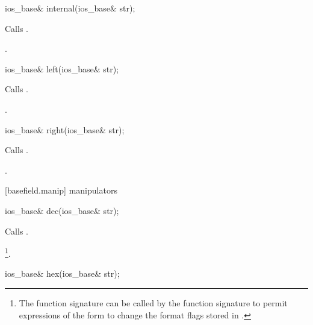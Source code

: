 %
\begin{itemdecl}
ios_base& internal(ios_base& str);
\end{itemdecl}

\begin{itemdescr}
\pnum
\effects
Calls
.

\pnum
\returns
{}.
\end{itemdescr}

%
\begin{itemdecl}
ios_base& left(ios_base& str);
\end{itemdecl}

\begin{itemdescr}
\pnum
\effects
Calls
.

\pnum
\returns
{}.
\end{itemdescr}

%
\begin{itemdecl}
ios_base& right(ios_base& str);
\end{itemdecl}

\begin{itemdescr}
\pnum
\effects
Calls
.

\pnum
\returns
{}.
\end{itemdescr}

[basefield.manip]{ manipulators}

%
\begin{itemdecl}
ios_base& dec(ios_base& str);
\end{itemdecl}

\begin{itemdescr}
\pnum
\effects
Calls
.

\pnum
\returns
{}\footnote{The function signature
can be called by
the function signature
to permit expressions of the form
to change the format flags stored in
.}.
\end{itemdescr}

%
\begin{itemdecl}
ios_base& hex(ios_base& str);
\end{itemdecl}

